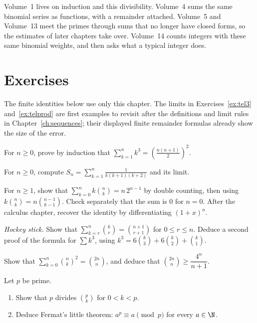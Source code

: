 Volume~1 lives on induction and this divisibility. Volume~4 sums the same binomial series as functions, with a remainder attached. Volume~5 and Volume~13 meet the primes through sums that no longer have closed forms, so the estimates of later chapters take over. Volume~14 counts integers with these same binomial weights, and then asks what a typical integer does.

\section{Exercises}
The finite identities below use only this chapter. The limits in Exercises~\ref{ex:tel3} and~\ref{ex:telprod} are first examples to revisit after the definitions and limit rules in Chapter~\ref{ch:sequences}; their displayed finite remainder formulas already show the size of the error.


\begin{exercise}[$\star$]\label{ex:cubes}
For $n\ge0$, prove by induction that $\displaystyle\sum_{k=1}^n k^3=\left(\frac{n(n+1)}2\right)^2$.
\end{exercise}

\begin{exercise}[$\star$]\label{ex:tel3}
For $n\ge0$, compute $\displaystyle S_n=\sum_{k=1}^n\frac1{k(k+1)(k+2)}$ and its limit.
\end{exercise}

\begin{exercise}[$\star$]\label{ex:kbinom}
For $n\ge1$, show that $\displaystyle\sum_{k=0}^n k\binom nk=n\,2^{n-1}$ by double counting, then using $k\binom nk=n\binom{n-1}{k-1}$. Check separately that the sum is $0$ for $n=0$. After the calculus chapter, recover the identity by differentiating $(1+x)^n$.
\end{exercise}

\begin{exercise}[$\star\star$]\label{ex:hockey}
\emph{Hockey stick.} Show that $\displaystyle\sum_{k=r}^n\binom kr=\binom{n+1}{r+1}$ for $0\le r\le n$.
Deduce a second proof of the formula for $\sum k^3$, using $k^3=6\binom k3+6\binom k2+\binom k1$.
\end{exercise}

\begin{exercise}[$\star\star$]\label{ex:squares}
Show that $\displaystyle\sum_{k=0}^n\binom nk^2=\binom{2n}n$, and deduce that $\binom{2n}n\ge\dfrac{4^n}{n+1}$.
\end{exercise}

\begin{exercise}[$\star\star$]\label{ex:fermat}
Let $p$ be prime.
\begin{enumerate}[label=(\alph*)]
\item Show that $p$ divides $\binom pk$ for $0<k<p$.
\item Deduce Fermat's little theorem: $a^p\equiv a\pmod p$ for every $a\in\N$.
\end{enumerate}
\end{exercise}

